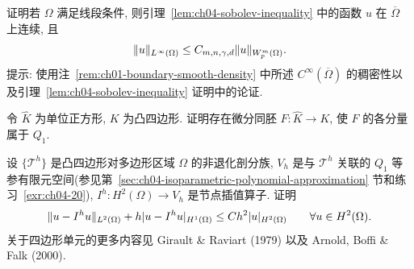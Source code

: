 \begin{MBExercise}
\label{exr:ch04-20}
证明若 $\Omega$ 满足线段条件, 则引理~\ref{lem:ch04-sobolev-inequality} 中的函数 $u$ 在 $\overline\Omega$ 上连续, 且
\[
\MathBookFormulaID{formula-ch04-exercise-20-sobolev-continuity}
\|u\|_{L^\infty(\Omega)}\leq C_{m,n,\gamma,d}\|u\|_{W_p^m(\Omega)}.
\]
提示: 使用注~\ref{rem:ch01-boundary-smooth-density} 中所述 $C^\infty(\overline\Omega)$ 的稠密性以及引理~\ref{lem:ch04-sobolev-inequality} 证明中的论证.
\end{MBExercise}

\begin{MBExercise}
\label{exr:ch04-21}
令 $\widehat K$ 为单位正方形, $K$ 为凸四边形. 证明存在微分同胚 $F:\widehat K\to K$, 使 $F$ 的各分量属于 $Q_1$.
\end{MBExercise}

\begin{MBExercise}
\label{exr:ch04-22}
设 $\{\mathcal T^h\}$ 是凸四边形对多边形区域 $\Omega$ 的非退化剖分族, $V_h$ 是与 $\mathcal T^h$ 关联的 $Q_1$ 等参有限元空间(参见第~\ref{sec:ch04-isoparametric-polynomial-approximation} 节和练习~\ref{exr:ch04-20}), $I^h:H^2(\Omega)\to V_h$ 是节点插值算子. 证明
\[
\MathBookFormulaID{formula-ch04-exercise-22-quadrilateral-isoparametric-error}
\|u-I^h u\|_{L^2(\Omega)}+h|u-I^h u|_{H^1(\Omega)}
\leq Ch^2|u|_{H^2(\Omega)}
\qquad\forall u\in H^2(\Omega).
\]
关于四边形单元的更多内容见 Girault \& Raviart (1979) 以及 Arnold, Boffi \& Falk (2000).
\end{MBExercise}
